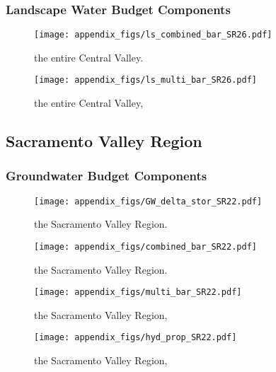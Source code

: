 \subsubsection{Landscape Water Budget Components}
\begin{figure}[ht]
\centerline{\texttt{[image: appendix\_figs/ls\_combined\_bar\_SR26.pdf]}}
\caption{\LSCombinedTextOne the entire Central Valley.\LSCombinedTextTwo}
\label{fig:LS_budget_SR26}
\end{figure}
\newpage

\begin{landscape}
\begin{figure}[ht]
\centerline{\texttt{[image: appendix\_figs/ls\_multi\_bar\_SR26.pdf]}}
\caption{\LSMultiTextOne the entire Central Valley,\LSMultiTextTwo}
\label{fig:multi_LS_budget_SR26}
\end{figure}
\newpage
\end{landscape}

\subsection{Sacramento Valley Region}
\subsubsection{Groundwater Budget Components}
\begin{figure}[h]
\centerline{\texttt{[image: appendix\_figs/GW\_delta\_stor\_SR22.pdf]}}
\caption{\GWBudgetText the Sacramento Valley Region.}
\label{fig:delta_stor_SR22}
\end{figure}
\newpage

\begin{figure}[ht]
\centerline{\texttt{[image: appendix\_figs/combined\_bar\_SR22.pdf]}}
\caption{\GWCombinedTextOne the Sacramento Valley Region.\GWCombinedTextTwo}
\label{fig:GW_budget_SR22}
\end{figure}
\newpage

\begin{landscape}
\begin{figure}[ht]
\centerline{\texttt{[image: appendix\_figs/multi\_bar\_SR22.pdf]}}
\caption{\GWMultiTextOne the Sacramento Valley Region,\GWMultiTextTwo}
\label{fig:multi_GW_budget_SR22}
\end{figure}
\newpage

\begin{figure}[ht]
\centerline{\texttt{[image: appendix\_figs/hyd\_prop\_SR22.pdf]}}
\caption{\HydPropOne the Sacramento Valley Region,\HydPropTwo}
\label{fig:hyd_prop_SR22}
\end{figure}
\newpage
\end{landscape}


